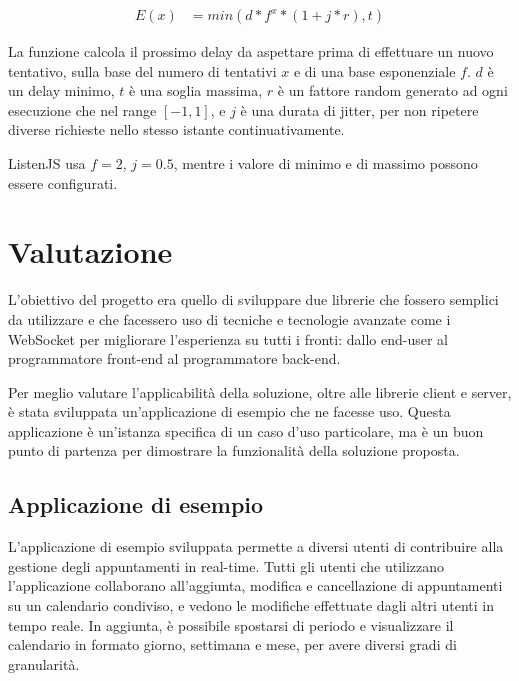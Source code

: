 \documentclass[12pt,a4paper,openright,twoside]{report}
\begin{document}
\begin{align*}
  E(x) &= min(d * f^x * (1 + j * r), t)
\end{align*}

La funzione calcola il prossimo delay da aspettare prima di effettuare un nuovo tentativo, sulla base del numero di tentativi $x$ e di una base esponenziale $f$. $d$ è un delay minimo, $t$ è una soglia massima, $r$ è un fattore random generato ad ogni esecuzione che nel range $[-1, 1]$, e $j$ è una durata di jitter, per non ripetere diverse richieste nello stesso istante continuativamente.

ListenJS usa $f=2$, $j=0.5$, mentre i valore di minimo e di massimo possono essere configurati.

\chapter{Valutazione}
L'obiettivo del progetto era quello di sviluppare due librerie che fossero semplici da utilizzare e che facessero uso di tecniche e tecnologie avanzate come i WebSocket per migliorare l'esperienza su tutti i fronti: dallo end-user al programmatore front-end al programmatore back-end.

\bigskip

Per meglio valutare l'applicabilità della soluzione, oltre alle librerie client e server, è stata sviluppata un'applicazione di esempio che ne facesse uso. Questa applicazione è un'istanza specifica di un caso d'uso particolare, ma è un buon punto di partenza per dimostrare la funzionalità della soluzione proposta.

\section{Applicazione di esempio}\label{sec_applicazioneesempio}
L'applicazione di esempio sviluppata permette a diversi utenti di contribuire alla gestione degli appuntamenti in real-time. Tutti gli utenti che utilizzano l'applicazione collaborano all'aggiunta, modifica e cancellazione di appuntamenti su un calendario condiviso, e vedono le modifiche effettuate dagli altri utenti in tempo reale. In aggiunta, è possibile spostarsi di periodo e visualizzare il calendario in formato giorno, settimana e mese, per avere diversi gradi di granularità.
\end{document}
